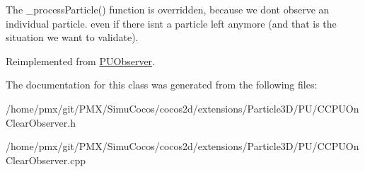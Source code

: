 The \+\_\+process\+Particle() function is overridden, because we don\textquotesingle{}t observe an individual particle. even if there isn\textquotesingle{}t a particle left anymore (and that is the situation we want to validate). 

Reimplemented from \hyperlink{classPUObserver}{P\+U\+Observer}.



The documentation for this class was generated from the following files\+:\begin{DoxyCompactItemize}
\item 
/home/pmx/git/\+P\+M\+X/\+Simu\+Cocos/cocos2d/extensions/\+Particle3\+D/\+P\+U/C\+C\+P\+U\+On\+Clear\+Observer.\+h\item 
/home/pmx/git/\+P\+M\+X/\+Simu\+Cocos/cocos2d/extensions/\+Particle3\+D/\+P\+U/C\+C\+P\+U\+On\+Clear\+Observer.\+cpp\end{DoxyCompactItemize}
